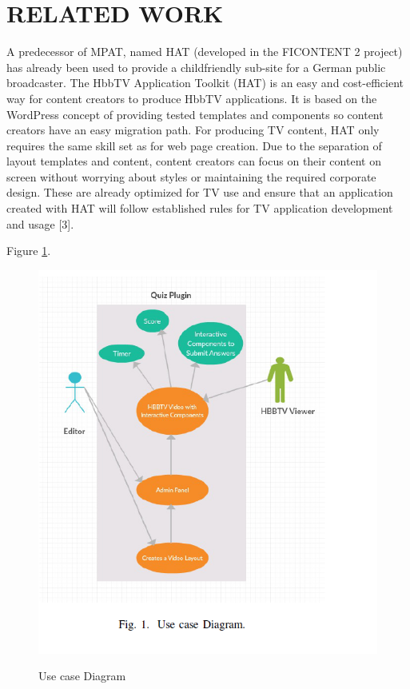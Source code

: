 \section{\textbf{RELATED WORK}}\label{sec:RELATED WORK}

A predecessor of MPAT, named HAT (developed in the FICONTENT
2 project) has already been used to provide a childfriendly
sub-site for a German public broadcaster. The HbbTV
Application Toolkit (HAT) is an easy and cost-efficient way
for content creators to produce HbbTV applications. It is based
on the WordPress concept of providing tested templates and
components so content creators have an easy migration path.
For producing TV content, HAT only requires the same skill
set as for web page creation. Due to the separation of layout
templates and content, content creators can focus on their
content on screen without worrying about styles or maintaining
the required corporate design. These are already optimized for
TV use and ensure that an application created with HAT will
follow established rules for TV application development and
usage [3].
















 Figure \ref{fig:Use-case-Diagram}.

\begin{figure}[!ht]
	\centering
\includegraphics[scale=0.6]{figures/Use-case-Diagram.png}\\
	\caption{Use case Diagram }
	\label{fig:Use-case-Diagram}
\end{figure}
 

 
    